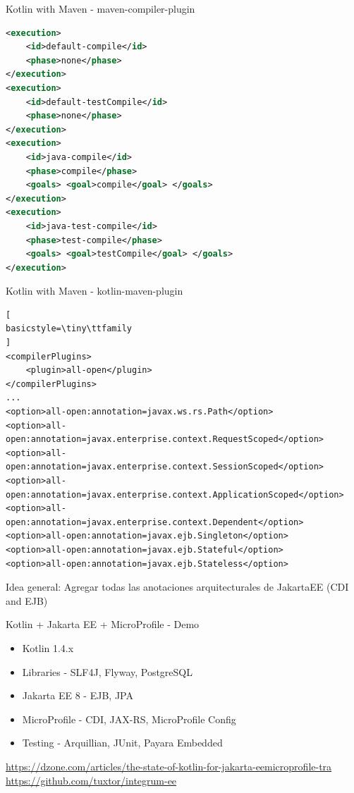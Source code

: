 \documentclass[aspectratio=169]{beamer}
\begin{document}
\begin{frame}[fragile]{Kotlin with Maven - maven-compiler-plugin}
\begin{lstlisting}[language=xml,
basicstyle=\tiny\ttfamily
]
<execution>
    <id>default-compile</id>
    <phase>none</phase>
</execution>
<execution>
    <id>default-testCompile</id>
    <phase>none</phase>
</execution>
<execution>
    <id>java-compile</id>
    <phase>compile</phase>
    <goals> <goal>compile</goal> </goals>
</execution>
<execution>
    <id>java-test-compile</id>
    <phase>test-compile</phase>
    <goals> <goal>testCompile</goal> </goals>
</execution>
\end{lstlisting}
\end{frame}


\begin{frame}[fragile]{Kotlin with Maven - kotlin-maven-plugin}
\begin{lstlisting}[
basicstyle=\tiny\ttfamily
]
<compilerPlugins>
    <plugin>all-open</plugin>
</compilerPlugins>
...
<option>all-open:annotation=javax.ws.rs.Path</option>
<option>all-open:annotation=javax.enterprise.context.RequestScoped</option>
<option>all-open:annotation=javax.enterprise.context.SessionScoped</option>
<option>all-open:annotation=javax.enterprise.context.ApplicationScoped</option>
<option>all-open:annotation=javax.enterprise.context.Dependent</option>
<option>all-open:annotation=javax.ejb.Singleton</option>
<option>all-open:annotation=javax.ejb.Stateful</option>
<option>all-open:annotation=javax.ejb.Stateless</option>
\end{lstlisting}

Idea general: Agregar todas las anotaciones arquitecturales de JakartaEE (CDI and EJB)
\end{frame}

\begin{frame}{Kotlin + Jakarta EE + MicroProfile  - Demo}

\begin{itemize}
	\item Kotlin 1.4.x
	\item Libraries - SLF4J, Flyway, PostgreSQL
	\item Jakarta EE 8 - EJB, JPA
	\item MicroProfile - CDI, JAX-RS, MicroProfile Config
	\item Testing - Arquillian, JUnit, Payara Embedded
\end{itemize}


\normalsize  \url{https://dzone.com/articles/the-state-of-kotlin-for-jakarta-eemicroprofile-tra}\\
\normalsize  \url{https://github.com/tuxtor/integrum-ee}
\end{frame}
\end{document}
